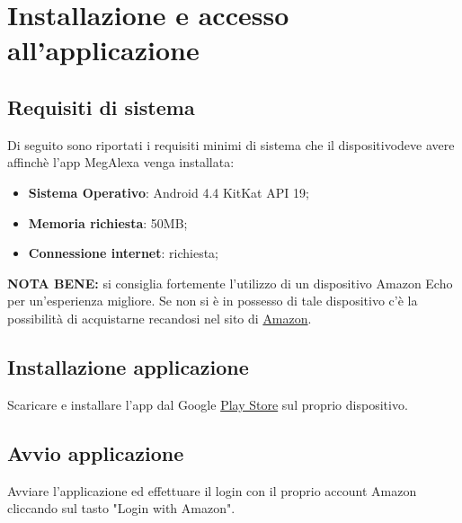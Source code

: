 \chapter{Installazione e accesso all'applicazione}
\label{Installazione}

\section{Requisiti di sistema}
Di seguito sono riportati i requisiti minimi di sistema che il dispositivodeve avere affinchè l'app MegAlexa venga installata: 

\begin{itemize}
	\item \textbf{Sistema Operativo}: Android 4.4 KitKat API 19;
	\item \textbf{Memoria richiesta}: 50MB;
	\item \textbf{Connessione internet}: richiesta;
\end{itemize}

\textbf{NOTA BENE:} si consiglia fortemente l'utilizzo di un dispositivo Amazon Echo per un'esperienza migliore. Se non si è in possesso di tale dispositivo c'è la possibilità di acquistarne recandosi nel sito di \href{https://www.amazon.it}{Amazon}.

\section{Installazione applicazione}
Scaricare e installare l'app dal Google \href{https://play.google.com/store/apps?hl=it}{Play Store} sul proprio dispositivo.
\newpage
\section{Avvio applicazione}

Avviare l'applicazione ed effettuare il login con il proprio account Amazon cliccando sul tasto "Login with Amazon".


